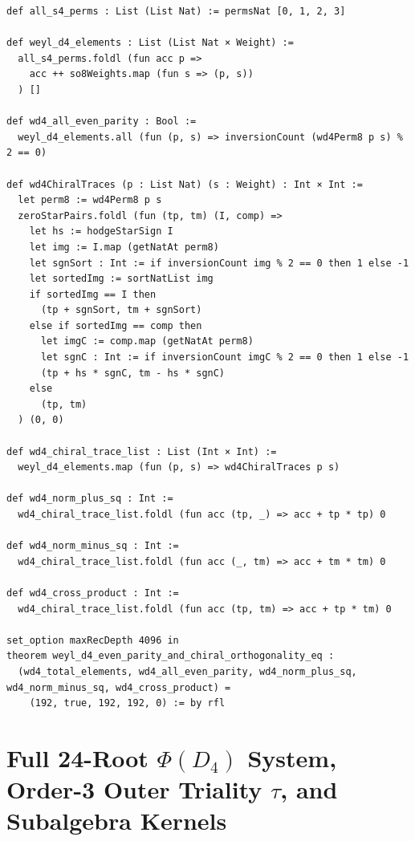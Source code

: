 \documentclass[11pt,a4paper]{article}
\begin{document}
\begin{lstlisting}[caption={Full $192$-element $W(D_4)$ generation, even parity, and chiral character orthogonality.}]
def all_s4_perms : List (List Nat) := permsNat [0, 1, 2, 3]

def weyl_d4_elements : List (List Nat × Weight) :=
  all_s4_perms.foldl (fun acc p =>
    acc ++ so8Weights.map (fun s => (p, s))
  ) []

def wd4_all_even_parity : Bool :=
  weyl_d4_elements.all (fun (p, s) => inversionCount (wd4Perm8 p s) % 2 == 0)

def wd4ChiralTraces (p : List Nat) (s : Weight) : Int × Int :=
  let perm8 := wd4Perm8 p s
  zeroStarPairs.foldl (fun (tp, tm) (I, comp) =>
    let hs := hodgeStarSign I
    let img := I.map (getNatAt perm8)
    let sgnSort : Int := if inversionCount img % 2 == 0 then 1 else -1
    let sortedImg := sortNatList img
    if sortedImg == I then
      (tp + sgnSort, tm + sgnSort)
    else if sortedImg == comp then
      let imgC := comp.map (getNatAt perm8)
      let sgnC : Int := if inversionCount imgC % 2 == 0 then 1 else -1
      (tp + hs * sgnC, tm - hs * sgnC)
    else
      (tp, tm)
  ) (0, 0)

def wd4_chiral_trace_list : List (Int × Int) :=
  weyl_d4_elements.map (fun (p, s) => wd4ChiralTraces p s)

def wd4_norm_plus_sq : Int :=
  wd4_chiral_trace_list.foldl (fun acc (tp, _) => acc + tp * tp) 0

def wd4_norm_minus_sq : Int :=
  wd4_chiral_trace_list.foldl (fun acc (_, tm) => acc + tm * tm) 0

def wd4_cross_product : Int :=
  wd4_chiral_trace_list.foldl (fun acc (tp, tm) => acc + tp * tm) 0

set_option maxRecDepth 4096 in
theorem weyl_d4_even_parity_and_chiral_orthogonality_eq :
  (wd4_total_elements, wd4_all_even_parity, wd4_norm_plus_sq, wd4_norm_minus_sq, wd4_cross_product) =
    (192, true, 192, 192, 0) := by rfl
\end{lstlisting}

\section{Full 24-Root \texorpdfstring{$\Phi(D_4)$}{Phi(D4)} System, Order-3 Outer Triality \texorpdfstring{$\tau$}{tau}, and Subalgebra Kernels}
\end{document}
